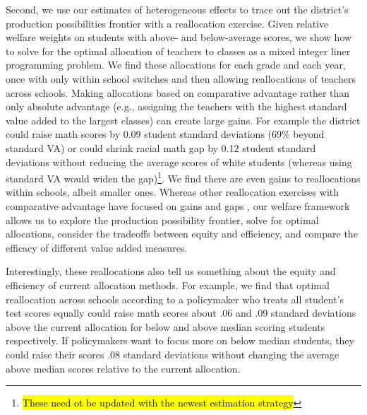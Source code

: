 \documentclass[12pt]{article}
\theoremstyle{definition}
\theoremstyle{definition}
\theoremstyle{definition}
\theoremstyle{definition}
\begin{document}
    Second, we use our estimates of heterogeneous effects to trace out the district’s production possibilities frontier with a reallocation exercise. Given relative welfare weights on students with above- and below-average scores, we show how to solve for the optimal allocation of teachers to classes as a mixed integer liner programming problem. We find these allocations for each grade and each year, once with only within school switches and then allowing reallocations of teachers across schools. Making allocations based on comparative advantage rather than only absolute advantage (e.g., assigning the teachers with the highest standard value added to the largest classes) can create large gains. For example the district could raise math scores by 0.09 student standard deviations (69\% beyond standard VA) or could shrink racial math gap by 0.12 student standard deviations without reducing the average scores of white students (whereas using standard VA would widen the gap)\footnote{\hl{These need ot be updated with the newest estimation strategy}}. We find there are even gains to reallocations within schools, albeit smaller ones. Whereas other reallocation exercises with comparative advantage have focused on gains and gaps \citep[e.g.,][]{Delgado2020}, our welfare framework allows us to explore the production possibility frontier, solve for optimal allocations,  consider the tradeoffs between equity and efficiency, and compare the efficacy of different value added measures.
    
    Interestingly, these reallocations also tell us something about the equity and efficiency of current allocation methods. For example, we find that optimal reallocation across schools according to a policymaker who treats all student's test scores equally could raise math scores about .06 and .09 standard deviations above the current allocation for below and above median scoring students respectively. If policymakers want to focus more on below median students, they could raise their scores .08 standard deviations without changing the average above median scores relative to the current allocation.  
    
    
\end{document}
